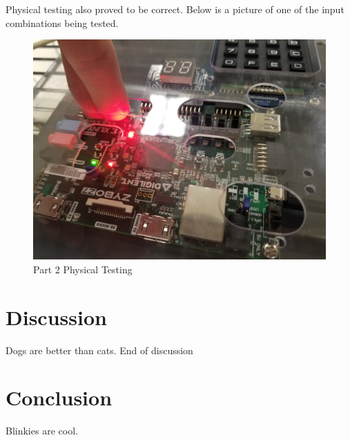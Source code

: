 \documentclass{article}
\begin{document}
    Physical testing also proved to be correct.
    Below is a picture of one of the input combinations being tested.

    \begin{figure}[H]
        \includegraphics[width=\linewidth]{access_testing.jpg}
        \caption{Part 2 Physical Testing}
        \label{fig:part2_testing}
    \end{figure}


    \section{Discussion}
    Dogs are better than cats.
    End of discussion

    \section{Conclusion}
    Blinkies are cool.
\end{document}
